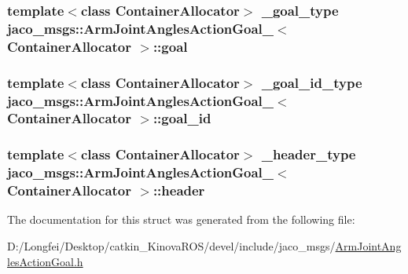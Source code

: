 \subsubsection[{\texorpdfstring{goal}{goal}}]{\setlength{\rightskip}{0pt plus 5cm}template$<$class Container\+Allocator$>$ {\bf \+\_\+goal\+\_\+type} {\bf jaco\+\_\+msgs\+::\+Arm\+Joint\+Angles\+Action\+Goal\+\_\+}$<$ Container\+Allocator $>$\+::goal}\hypertarget{structjaco__msgs_1_1ArmJointAnglesActionGoal___a49d89800555751e2af0e706f63117a49}{}\label{structjaco__msgs_1_1ArmJointAnglesActionGoal___a49d89800555751e2af0e706f63117a49}
\subsubsection[{\texorpdfstring{goal\+\_\+id}{goal_id}}]{\setlength{\rightskip}{0pt plus 5cm}template$<$class Container\+Allocator$>$ {\bf \+\_\+goal\+\_\+id\+\_\+type} {\bf jaco\+\_\+msgs\+::\+Arm\+Joint\+Angles\+Action\+Goal\+\_\+}$<$ Container\+Allocator $>$\+::goal\+\_\+id}\hypertarget{structjaco__msgs_1_1ArmJointAnglesActionGoal___a39cdbc82b664305b99e55ff1fe6bddd2}{}\label{structjaco__msgs_1_1ArmJointAnglesActionGoal___a39cdbc82b664305b99e55ff1fe6bddd2}
\subsubsection[{\texorpdfstring{header}{header}}]{\setlength{\rightskip}{0pt plus 5cm}template$<$class Container\+Allocator$>$ {\bf \+\_\+header\+\_\+type} {\bf jaco\+\_\+msgs\+::\+Arm\+Joint\+Angles\+Action\+Goal\+\_\+}$<$ Container\+Allocator $>$\+::header}\hypertarget{structjaco__msgs_1_1ArmJointAnglesActionGoal___a22314506f0a5afc168c1520293c0face}{}\label{structjaco__msgs_1_1ArmJointAnglesActionGoal___a22314506f0a5afc168c1520293c0face}


The documentation for this struct was generated from the following file\+:\begin{DoxyCompactItemize}
\item 
D\+:/\+Longfei/\+Desktop/catkin\+\_\+\+Kinova\+R\+O\+S/devel/include/jaco\+\_\+msgs/\hyperlink{ArmJointAnglesActionGoal_8h}{Arm\+Joint\+Angles\+Action\+Goal.\+h}\end{DoxyCompactItemize}
